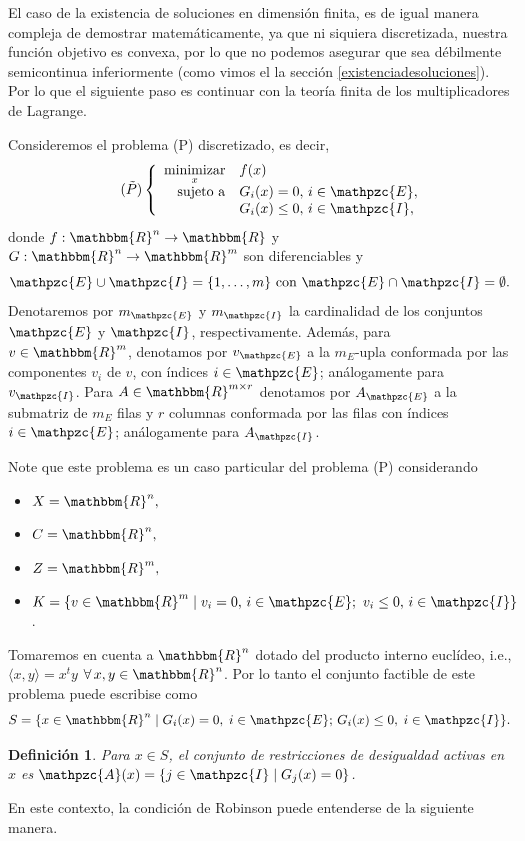 \documentclass[a4paper,10pt]{book}
\newcommand{\R}{\mathbbm{R}}
\newcommand{\Rn}{\R^n}
\newcommand{\arr}{\rightarrow}
\newcommand{\cI}{\mathpzc{I}}
\newcommand{\cE}{\mathpzc{E}}
\newcommand{\cA}{\mathpzc{A}}
\newcommand{\la}{\langle}
\newcommand{\ra}{\rangle}
\newtheorem{defi}[teo]{Definici\'on}
\begin{document}
El caso de la existencia de soluciones en dimensión finita, es de igual manera compleja de demostrar matemáticamente, ya que ni siquiera discretizada, nuestra función objetivo es convexa, por lo que no podemos asegurar que sea débilmente semicontinua inferiormente (como vimos el la sección \ref{existenciadesoluciones}). Por lo que el siguiente paso es continuar con la teoría finita de los multiplicadores de Lagrange.

Consideremos el problema (P) discretizado, es decir,
\[\tag{$\tilde{P}$}
\left\{\begin{array}{rl}
\displaystyle \mathop{\mathrm{minimizar}}_{x} & \displaystyle f(x) \\
\mathrm{sujeto \ a} & G_i(x)=0, \, i\in \cE,\\
                    & G_i(x)\leq 0, \, i\in \cI,
\end{array}\right.
\]
donde $f:\R^n\arr\R$ y $G:\R^n\arr\R^m$ son diferenciables y $$\cE\cup \cI=\{1,\ldots,m\}\mbox{ con } \cE\cap \cI=\emptyset.$$
Denotaremos por $m_\cE$ y $m_\cI$ la cardinalidad de los conjuntos $\cE$ y $\cI$, respectivamente. Además, para $v\in\R^m$, denotamos por $v_\cE$ a la $m_E$-upla conformada por las componentes $v_i$ de $v$, con índices $i\in \cE$; análogamente para $v_\cI$. Para $A\in\R^{m\times r}$ denotamos por $A_\cE$ a la submatriz de $m_E$ filas y $r$ columnas conformada por las filas con índices $i\in \cE$; análogamente para $A_\cI$.


Note que este problema es un caso particular del problema (P) considerando
\begin{itemize}
    \item $X=\Rn,$
    \item $C=\Rn,$
    \item $Z=\R^m,$
    \item $K=\{v\in\R^m\mid v_i=0,\,i\in\cE;\ v_i\leq 0,\,i\in \cI\}$.
\end{itemize}
Tomaremos en cuenta a $\Rn$ dotado del producto interno euclídeo, i.e., $\la x,y\ra=x^ty$ $\forall\, x,y\in\Rn$. 
Por lo tanto el conjunto factible de este problema puede escribise como
\[
 S=\{x\in\Rn \mid G_i(x)=0,\; i\in\cE;\, G_i(x)\leq0,\; i\in\cI\}.
\]


\begin{defi}
Para $x\in S$, el conjunto de restricciones de desigualdad activas en $x$ es $\cA(x)=\{j\in\cI \mid G_j(x)=0\}$.
\end{defi}

En este contexto, la condición de Robinson puede entenderse de la siguiente manera.
\end{document}
